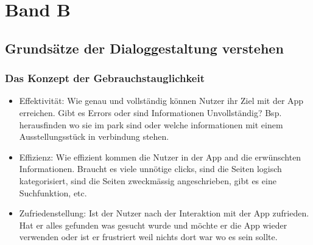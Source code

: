 \documentclass[10pt]{article}
\begin{document}
	\pagebreak
	
	\section{Band B}
	\subsection{Grundsätze der Dialoggestaltung verstehen}
	\subsubsection[Konzept der Gebrauchs Tauglichkeit]{Das Konzept der Gebrauchstauglichkeit}
	\begin{itemize}
		\item Effektivität: Wie genau und vollständig können Nutzer ihr Ziel mit der App erreichen. Gibt es Errors oder sind Informationen Unvollständig? Bsp. herausfinden wo sie im park sind oder welche informationen mit einem Ausstellungsstück in verbindung stehen.
		
		\item Effizienz: Wie effizient kommen die Nutzer in der App and die erwünschten Informationen. Braucht es viele unnötige clicks, sind die Seiten logisch kategorisiert, sind die Seiten zweckmässig angeschrieben, gibt es eine Suchfunktion, etc.
		
		\item Zufriedenstellung: Ist der Nutzer nach der Interaktion mit der App zufrieden. Hat er alles gefunden was gesucht wurde und möchte er die App wieder verwenden oder ist er frustriert weil nichts dort war wo es sein sollte.
	\end{itemize}
\end{document}
